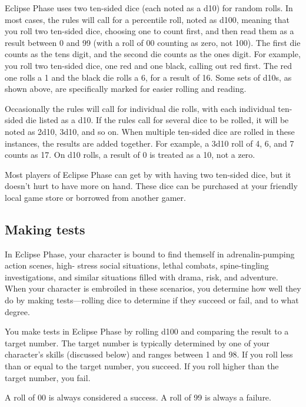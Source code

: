 Eclipse Phase uses two ten-sided dice (each noted as a d10) for random
rolls. In most cases, the rules will call for a percentile roll, noted
as d100, meaning that you roll two ten-sided dice, choosing one to
count first, and then read them as a result between 0 and 99 (with a
roll of 00 counting as zero, not 100). The first die counts as the
tens digit, and the second die counts as the ones digit. For example,
you roll two ten-sided dice, one red and one black, calling out red
first. The red one rolls a 1 and the black die rolls a 6, for a result
of 16. Some sets of d10s, as shown above, are specifically marked for
easier rolling and reading.

Occasionally the rules will call for individual die rolls, with each
individual ten-sided die listed as a d10.  If the rules call for
several dice to be rolled, it will be noted as 2d10, 3d10, and so
on. When multiple ten-sided dice are rolled in these instances, the
results are added together. For example, a 3d10 roll of 4, 6, and 7
counts as 17. On d10 rolls, a result of 0 is treated as a 10, not a
zero.

Most players of Eclipse Phase can get by with having two ten-sided
dice, but it doesn't hurt to have more on hand. These dice can be
purchased at your friendly local game store or borrowed from another
gamer.


\subsection{Making tests}
\label{sec:making-tests}

In Eclipse Phase, your character is bound to find themself in
adrenalin-pumping action scenes, high- stress social situations,
lethal combats, spine-tingling investigations, and similar situations
filled with drama, risk, and adventure. When your character is
embroiled in these scenarios, you determine how well they do by making
tests—rolling dice to determine if they succeed or fail, and to what
degree.

You make tests in Eclipse Phase by rolling d100 and comparing the
result to a target number. The target number is typically determined
by one of your character's skills (discussed below) and ranges between
1 and 98. If you roll less than or equal to the target number, you
succeed. If you roll higher than the target number, you fail.

A roll of 00 is always considered a success. A roll of 99 is always a
failure.

